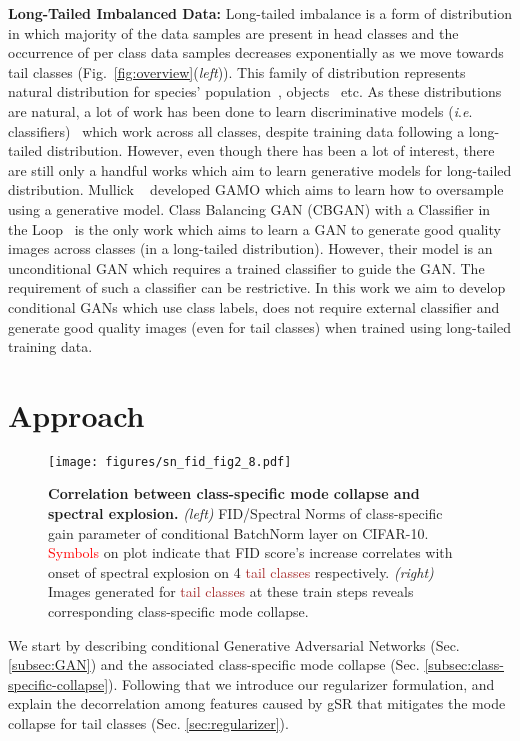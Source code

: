\documentclass[runningheads,table]{llncs}
\newcommand{\ie}{\textit{i}.\textit{e}. }
\begin{document}
\noindent \textbf{Long-Tailed Imbalanced Data:} Long-tailed imbalance is a form of distribution in which majority of the data samples are present in head classes and the occurrence of per class data samples decreases exponentially as we move towards tail classes (Fig.~\ref{fig:overview}(\textit{left})). This family of distribution represents natural distribution for species' population~\cite{inat19}, objects~\cite{wang2017learning} etc. As these distributions are natural, a lot of work has been done to learn discriminative models (\ie classifiers)~\cite{cao2019learning, cui2019classbalancedloss, menon2021longtail, kang2019decoupling, yang2020rethinking, zhou2020BBN} which work across all classes, despite training data following a long-tailed distribution. However, even though there has been a lot of interest, there are still only a handful works which aim to learn generative models for long-tailed distribution. Mullick \etal~\cite{Mullick_2019_ICCV} developed GAMO which aims to learn how to oversample using a generative model. Class Balancing GAN (CBGAN) with a Classifier in the Loop~\cite{rangwani2021class} is the only work which aims to learn a GAN to generate good quality images across classes (in a long-tailed distribution). However, their model is an unconditional GAN which requires a trained classifier to guide the GAN. The requirement of such a classifier can be restrictive. In this work we aim to develop conditional GANs which use class labels, does not require external classifier and generate good quality images (even for tail classes) when trained using long-tailed training data.

\section{Approach}
\begin{figure*}[t]    
    \centering
    \texttt{[image: figures/sn\_fid\_fig2\_8.pdf]}
    \caption{\textbf{Correlation between class-specific mode collapse and spectral explosion.} \emph{(left)} FID/Spectral Norms of class-specific gain parameter of conditional BatchNorm layer on CIFAR-10. \textcolor{red}{Symbols} on plot indicate that FID score's increase correlates with onset of spectral explosion on 4 \textcolor{brown}{tail classes} respectively. \emph{(right)} Images generated for \textcolor{brown}{tail classes} at these train steps reveals corresponding class-specific mode collapse. 
    \label{fig:sn_fid}
    }
\end{figure*}
We start by describing conditional Generative Adversarial Networks (Sec. \ref{subsec:GAN}) and the associated class-specific mode collapse (Sec. \ref{subsec:class-specific-collapse}). Following that we introduce our regularizer formulation, and explain the decorrelation among features caused by gSR that mitigates the mode collapse for tail classes (Sec. \ref{sec:regularizer}).
\end{document}

